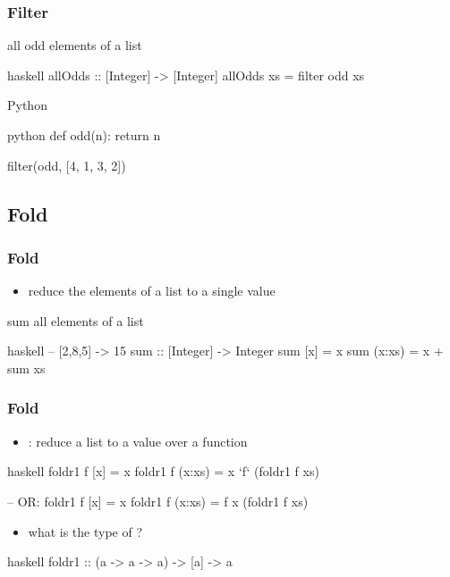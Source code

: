 \documentclass[dvipsnames]{beamer}
\theoremstyle{plain}
\begin{document}
\begin{frame}[fragile]
  \frametitle{Filter}

  \begin{exampleblock}{all odd elements of a list}
    \begin{pygments}{haskell}
allOdds :: [Integer] -> [Integer]
allOdds xs = filter odd xs
    \end{pygments}
  \end{exampleblock}

  \bigskip
  \begin{exampleblock}{Python}
    \begin{pygments}{python}
def odd(n):
    return n %

filter(odd, [4, 1, 3, 2])
    \end{pygments}
  \end{exampleblock}
\end{frame}

\subsection{Fold}

\begin{frame}[fragile]
  \frametitle{Fold}

  \begin{itemize}
    \item reduce the elements of a list to a single value
  \end{itemize}

  \begin{exampleblock}{sum all elements of a list}
    \begin{pygments}{haskell}
-- [2,8,5] -> 15
sum :: [Integer] -> Integer
sum [x]    = x
sum (x:xs) = x + sum xs
    \end{pygments}
  \end{exampleblock}
\end{frame}

\begin{frame}[fragile]
  \frametitle{Fold}

  \begin{itemize}
    \item {}: reduce a list to a value over a function
  \end{itemize}

  \begin{exampleblock}{}
    \begin{pygments}{haskell}
foldr1 f [x]    = x
foldr1 f (x:xs) = x `f` (foldr1 f xs)

-- OR:
foldr1 f [x]    = x
foldr1 f (x:xs) = f x (foldr1 f xs)
    \end{pygments}
  \end{exampleblock}

  \pause
  \begin{itemize}
    \item what is the type of ?
  \end{itemize}

  \begin{pygments}{haskell}
foldr1 :: (a -> a -> a) -> [a] -> a
  \end{pygments}
\end{frame}
\end{document}
